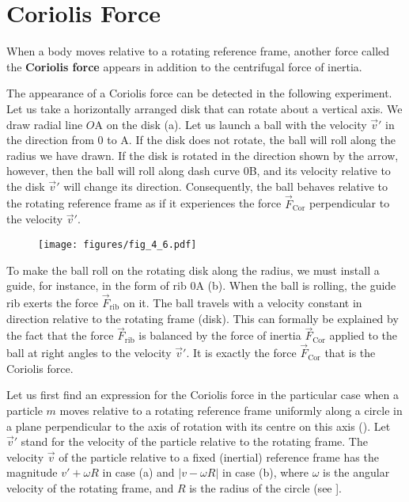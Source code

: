 \section{Coriolis Force}\label{sec:4_3}

When a body moves relative to a rotating reference frame, another force called the \textbf{Coriolis force} appears in addition to the centrifugal force of inertia.

The appearance of a Coriolis force can be detected in the following experiment. Let us take a horizontally arranged disk that can rotate about a vertical axis. We draw radial line $O$A on the disk (a). Let us launch a ball with the velocity $\vec{v}'$ in the direction from $0$ to A. If the disk does not rotate, the ball will roll along the radius we have drawn. If the disk is rotated in the direction shown by the arrow, however, then the ball will roll along dash curve $0$B, and its velocity relative to the disk $\vec{v}'$ will change its direction. Consequently, the ball behaves relative to the rotating reference frame as if it experiences the force $\vec{F}_{\text{Cor}}$ perpendicular to the velocity $\vec{v}'$.

\begin{figure}[t]
	\begin{center}
		\texttt{[image: figures/fig\_4\_6.pdf]}
		\caption[]{}
		\label{fig:4_6}
	\end{center}
\end{figure}

To make the ball roll on the rotating disk along the radius, we must install a guide, for instance, in the form of rib $0$A (b). When the ball is rolling, the guide rib exerts the force $\vec{F}_{\text{rib}}$ on it. The ball travels with a velocity constant in direction relative to the rotating frame (disk). This can formally be explained by the fact that the force $\vec{F}_{\text{rib}}$ is balanced by the force of inertia $\vec{F}_{\text{Cor}}$ applied to the ball at right angles to the velocity $\vec{v}'$. It is exactly the force $\vec{F}_{\text{Cor}}$ that is the Coriolis force.

Let us first find an expression for the Coriolis force in the particular case when a particle $m$ moves relative to a rotating reference frame uniformly along a circle in a plane perpendicular to the axis of rotation with its centre on this axis (). Let $\vec{v}'$ stand for the velocity of the particle relative to the rotating frame. The velocity $\vec{v}$ of the particle relative to a fixed (inertial) reference frame has the magnitude $v'+\omega R$ in case (a) and $|v-\omega R|$ in case (b), where $\omega$ is the angular velocity of the rotating frame, and $R$ is the radius of the circle (see ].

